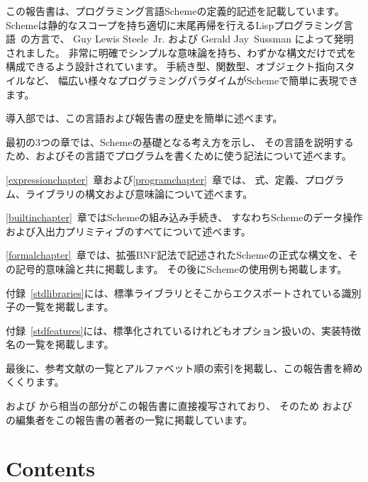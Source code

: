 この報告書は、プログラミング言語Schemeの定義的記述を記載しています。
Schemeは静的なスコープを持ち適切に末尾再帰を行えるLispプログラミング言語~\cite{McCarthy}の方言で、
Guy Lewis Steele~Jr. および Gerald Jay~Sussman によって発明されました。
非常に明確でシンプルな意味論を持ち、わずかな構文だけで式を構成できるよう設計されています。
手続き型、関数型、オブジェクト指向スタイルなど、
幅広い様々なプログラミングパラダイムがSchemeで簡単に表現できます。

\vest 導入部では、この言語および報告書の歴史を簡単に述べます。

\vest 最初の3つの章では、Schemeの基礎となる考え方を示し、
その言語を説明するため、およびその言語でプログラムを書くために使う記法について述べます。

\vest \ref{expressionchapter}~章および\ref{programchapter}~章では、
式、定義、プログラム、ライブラリの構文および意味論について述べます。

\vest \ref{builtinchapter}~章ではSchemeの組み込み手続き、
すなわちSchemeのデータ操作および入出力プリミティブのすべてについて述べます。

\vest \ref{formalchapter}~章では、拡張BNF記法で記述されたSchemeの正式な構文を、その記号的意味論と共に掲載します。
その後にSchemeの使用例も掲載します。

\vest 付録~\ref{stdlibraries}には、標準ライブラリとそこからエクスポートされている識別子の一覧を掲載します。

\vest 付録~\ref{stdfeatures}には、標準化されているけれどもオプション扱いの、実装特徴名の一覧を掲載します。


\vest 最後に、参考文献の一覧とアルファベット順の索引を掲載し、この報告書を締めくくります。

\begin{note}
\rfivers および \rsixrs から相当の部分がこの報告書に直接複写されており、
そのため \rfivers および \rsixrs の編集者をこの報告書の著者の一覧に掲載しています。
\end{note}


\vfill
\eject

\chapter*{Contents}
\addvspace{3.5pt}                  %
\renewcommand{\tocshrink}{-3.5pt}  %
{\footnotesize
\tableofcontents
}

\vfill
\eject

